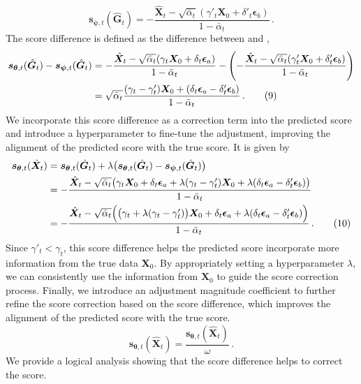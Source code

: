 \documentclass{article}
\newcommand{\s}{{{\bm s}}}
\newcommand{\X}{{{\bm X}}}
\newcommand{\G}{{{\bm G}}}
\newcommand{\EPS}{{\bm\epsilon}}
\newcommand{\THETA}{{\bm\theta}}
\newcommand{\PSI}{{\bm\psi}}
\begin{document}
\begin{equation}
\s_{\PSI,t}(\hat{\G}_t)=-\frac{\hat{\X}_t-\sqrt{\bar{\alpha}_t}(\gamma'_t\X_0+\delta'_t\EPS_b)}{{1-\bar{\alpha}_t}}\,.
\label{eq:rewritten_new_score}
\end{equation}
The score difference is defined as the difference between  and ,
\begin{align}
\s_{\THETA,t}(\hat{\G}_t) - \s_{\PSI,t}(\hat{\G}_t) 
&= -\frac{\hat{\X}_t - \sqrt{\bar{\alpha}_t}(\gamma_t\X_0 + \delta_t\EPS_a)}{1 - \bar{\alpha}_t} 
- \left(-\frac{\hat{\X}_t - \sqrt{\bar{\alpha}_t}(\gamma'_t\X_0 + \delta'_t\EPS_b)}{1 - \bar{\alpha}_t}\right) \notag \\
&= \sqrt{\bar{\alpha}_t} \frac{(\gamma_t - \gamma'_t)\X_0 + (\delta_t\EPS_a - \delta'_t\EPS_b)}{1 - \bar{\alpha}_t}\,.\tag{9}
\label{eq:score_difference}
\end{align}
We incorporate this score difference as a correction term into the predicted score and introduce a hyperparameter to fine-tune the adjustment, improving the alignment of the predicted score with the true score. It is given by
\begin{align}
{\s}_{\THETA,t}(\hat{\X}_t)&=\s_{\THETA,t}(\hat{\G}_t) + \lambda \bigl( \s_{\THETA,t}(\hat{\G}_t) - \s_{\PSI,t}(\hat{\G}_t) \bigr) \notag\\
&= -\frac{\hat{\X}_t - \sqrt{\bar{\alpha}_t} \bigl( \gamma_t \X_0 + \delta_t \EPS_a + \lambda (\gamma_t - \gamma'_t) \X_0 + \lambda (\delta_t \EPS_a - \delta'_t \EPS_b) \bigr)}{1 - \bar{\alpha}_t}\notag \\
&= -\frac{\hat{\X}_t - \sqrt{\bar{\alpha}_t} \Bigl(\bigl(\gamma_t + \lambda (\gamma_t - \gamma'_t)\bigr) \X_0 + \delta_t \EPS_a + \lambda (\delta_t \EPS_a - \delta'_t \EPS_b) \Bigr)}{1 - \bar{\alpha}_t}\,.\tag{10}
\label{eq:final_corrected_score}
\end{align}
Since $\gamma'_t < \gamma_t$, this score difference helps the predicted score incorporate more information from the true data $\X_0$. By appropriately setting a hyperparameter $\lambda$, we can consistently use the information from $\X_0$ to guide the score correction process. Finally, we introduce an adjustment magnitude coefficient to further refine the score correction based on the score difference, which improves the alignment of the predicted score with the true score.
\begin{equation}
{\s}_{\THETA,t}(\hat{\X}_t) = \frac{{\s}_{\THETA,t}(\hat{\X}_t)}{\omega}\,.\tag{11}
\label{eq:final_corrected_score_add_magnitude}
\end{equation}
We provide a logical analysis showing that the score difference helps to correct the score.
\end{document}

